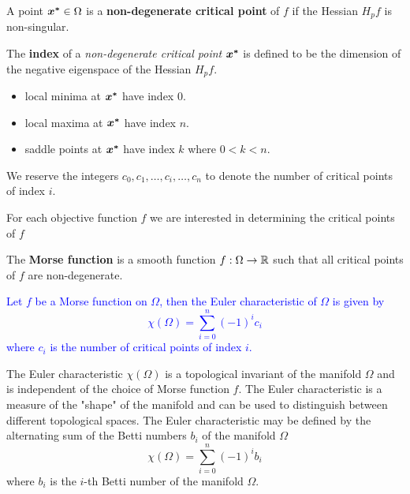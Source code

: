 \documentclass[11pt]{article}
\begin{document}
    \begin{definition}
        A point $\bm{x^*} \in \Omega$ is a \textbf{non-degenerate critical point} of $f$ if
        the Hessian $H_p f$ is non-singular.
    \end{definition}

    \begin{definition}
        The \textbf{index} of a \emph{non-degenerate critical point} $\bm{x^*}$ is defined to be
        the dimension of the negative eigenspace of the Hessian $H_p f$.
        \begin{itemize}
            \item local minima at $\bm{x^*}$ have index $0$.
            \item local maxima at $\bm{x^*}$ have index $n$.
            \item saddle points at $\bm{x^*}$ have index $k$ where $0 < k < n$.
        \end{itemize}
        We reserve the integers $c_0, c_1, \dots, c_i, \dots, c_n$ to denote the number of
        critical points of index $i$.
    \end{definition}

    \begin{remark}
        For each objective function $f$ we are interested in determining the
        critical points of $f$ 
    \end{remark}

    \begin{remark}
        The \textbf{Morse function} is a smooth function $f : \Omega \rightarrow \mathbb{R}$ such that
        all critical points of $f$ are non-degenerate.
    \end{remark}

    \begin{theorem}
        \textcolor{Blue}{
            Let $f$ be a Morse function on $\Omega$, then the Euler characteristic of $\Omega$ is
            given by
            $$
                \chi(\Omega) = \sum_{i=0}^n (-1)^i c_i
            $$
            where $c_i$ is the number of critical points of index $i$.
        }
    \end{theorem}

    \begin{remark}
        The Euler characteristic $\chi(\Omega)$ is a topological invariant of the manifold $\Omega$
        and is independent of the choice of Morse function $f$.
        The Euler characteristic is a measure of the "shape" of the manifold and can be used to
        distinguish between different topological spaces.
        The Euler characteristic may be defined by the alternating sum of the Betti numbers
        $b_i$ of the manifold $\Omega$
        $$
            \chi(\Omega) = \sum_{i=0}^n (-1)^i b_i
        $$
        where $b_i$ is the $i$-th Betti number of the manifold $\Omega$.
    \end{remark}
\end{document}
